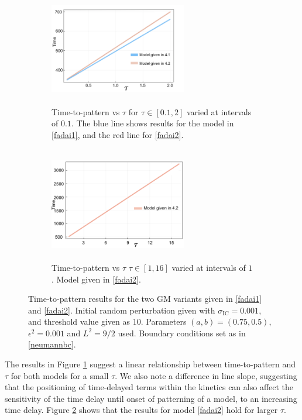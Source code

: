 \begin{figure}[H]
    \centering
    \begin{subfigure}[t]{0.45\textwidth}
        \centering
        \includegraphics[width=6cm,height = 5cm]{gmlin1.png}
        \caption{Time-to-pattern vs $\tau$ for $\tau\in[0.1,2]$ varied at intervals of $0.1$. The blue line shows results for the model in \eqref{fadai1}, and the red line for \eqref{fadai2}.}
        \label{fig:gmlin1}
    \end{subfigure}
    \hfill
    \begin{subfigure}[t]{0.45\textwidth}
        \centering
        \includegraphics[width=6cm,height = 5cm]{gmlin2.png}
        \caption{Time-to-pattern vs $\tau$ $\tau\in[1,16]$ varied at intervals of $1$. Model given in \eqref{fadai2}.}
        \label{fig:gmlin2}
    \end{subfigure}
    \caption{Time-to-pattern results for the two GM variants given in \eqref{fadai1} and \eqref{fadai2}. Initial random perturbation given with $\sigma_{\text{IC}}=0.001$, and threshold value given as $10$. Parameters $(a,b)=(0.75,0.5)$, $\epsilon^2=0.001$ and $L^2=9/2$ used. Boundary conditions set as in \eqref{neumannbc}.}
    \label{fig:fadlin}
\end{figure}
The results in Figure \ref{fig:gmlin1} suggest a linear relationship between time-to-pattern and $\tau$ for both models for a small $\tau$. We also note a difference in line slope, suggesting that the positioning of time-delayed terms within the kinetics can also affect the sensitivity of the time delay until onset of patterning of a model, to an increasing time delay. Figure \ref{fig:gmlin2} shows that the results for model \eqref{fadai2} hold for larger $\tau$.

